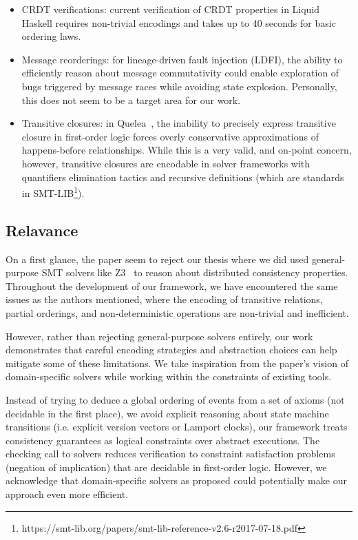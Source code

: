 {  \begin{itemize}
    \item CRDT verifications: current verification of CRDT properties
      in Liquid Haskell
      requires non-trivial encodings and takes up to 40 seconds for
      basic ordering
      laws.

    \item Message reorderings: for lineage-driven fault injection
      (LDFI), the ability to
      efficiently reason about message commutativity could enable
      exploration of bugs
      triggered by message races while avoiding state explosion.
      Personally, this does
      not seem to be a target area for our work.

    \item Transitive closures: in
      Quelea~\cite{sivaramakrishnan2015declarative}, the inability
      to precisely express transitive closure in first-order logic forces overly
      conservative approximations of happens-before relationships.
      While this is a
      very valid, and on-point concern, however, transitive closures
      are encodable in
      solver frameworks with quantifiers elimination tactics and
      recursive definitions
      (which are standards in
      SMT-LIB\footnote{https://smt-lib.org/papers/smt-lib-reference-v2.6-r2017-07-18.pdf}).
  \end{itemize}

  \subsection{Relavance}

  On a first glance, the paper seem to reject our thesis where we did used
  general-purpose SMT solvers like Z3~\cite{demoura2008z3} to reason
  about distributed
  consistency properties. Throughout the development of our framework, we have
  encountered the same issues as the authors mentioned, where the encoding of
  transitive relations, partial orderings, and non-deterministic operations are
  non-trivial and inefficient.

  However, rather than rejecting general-purpose solvers entirely, our work
  demonstrates that careful encoding strategies and abstraction choices can help
  mitigate some of these limitations. We take inspiration from the
  paper's vision
  of domain-specific solvers while working within the constraints of existing
  tools.

  Instead of trying to deduce a global ordering of events from a set of axioms
  (not decidable in the first place), we avoid explicit reasoning about state
  machine transitions (i.e. explicit version vectors or Lamport clocks), our
  framework treats consistency guarantees as logical constraints over abstract
  executions. The checking call to solvers reduces verification to constraint
  satisfaction problems (negation of implication) that are decidable in
  first-order logic. However, we acknowledge that domain-specific solvers as
  proposed could potentially make our approach even more efficient.

}
